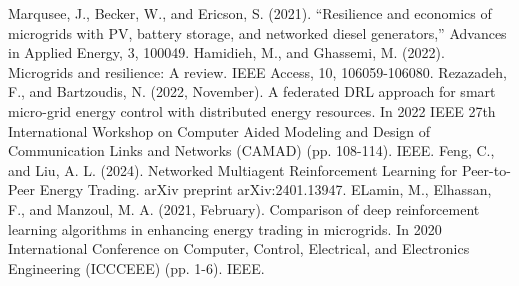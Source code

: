 \documentclass[conference]{IEEEtran}
\begin{document}
\begin{thebibliography}{00}
 Marqusee, J., Becker, W., and Ericson, S. (2021).  ``Resilience and economics of microgrids with PV, battery storage, and networked diesel generators,'' Advances in Applied Energy, 3, 100049.
 Hamidieh, M., and Ghassemi, M. (2022). Microgrids and resilience: A review. IEEE Access, 10, 106059-106080.
 Rezazadeh, F., and Bartzoudis, N. (2022, November). A federated DRL approach for smart micro-grid energy control with distributed energy resources. In 2022 IEEE 27th International Workshop on Computer Aided Modeling and Design of Communication Links and Networks (CAMAD) (pp. 108-114). IEEE.
 Feng, C., and Liu, A. L. (2024). Networked Multiagent Reinforcement Learning for Peer-to-Peer Energy Trading. arXiv preprint arXiv:2401.13947.
 ELamin, M., Elhassan, F., and Manzoul, M. A. (2021, February). Comparison of deep reinforcement learning algorithms in enhancing energy trading in microgrids. In 2020 International Conference on Computer, Control, Electrical, and Electronics Engineering (ICCCEEE) (pp. 1-6). IEEE.

\end{thebibliography}
\end{document}

